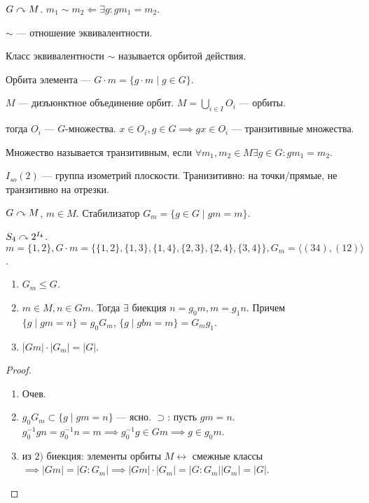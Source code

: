 \begin{definition}
    $G \curvearrowright M$.  $m_1 \sim m_2 \Leftarrow \exists g\!: gm_1 = m_2$.
\end{definition}
\begin{statement}
    $\sim$ --- отношение эквивалентности.
\end{statement}
\begin{definition}
    Класс эквивалентности $\sim$ называется орбитой действия.
\end{definition}
\begin{definition}
    Орбита элемента --- $G \cdot m = \{g \cdot m \mid g \in G\}$.
\end{definition}
 \begin{remark}
    $M$ --- дизъюнктное объединение орбит.
    $M = \bigcup\limits_{i \in I} O_i$ --- орбиты. 

    тогда $O_i$ ---  $G$-множества.  $x \in O_i, g \in G \implies gx \in O_i$ --- транзитивные множества.
\end{remark}
\begin{definition}
    Множество называется транзитивным, если $\forall m_1, m_2 \in M \exists g \in G\!: gm_1 = m_2$.
\end{definition}
\begin{definition}
    $I_{so}(2)$ --- группа изометрий плоскости. Транизитивно: на точки/прямые, не транзитивно на отрезки.
\end{definition}
\begin{definition}
    $G \curvearrowright M$,  $m \in M$. Стабилизатор  $G_m = \{g \in G \mid gm = m\}$.
\end{definition}
\begin{example}
    $S_4 \curvearrowright 2^{I_4}$.  $m = \{1,2\}, G \cdot m = \{ \{1,2\}, \{1,3\}, \{1,4\}, \{2,3\},\{2,4\},\{3,4\}\}, G_m = \langle (34), (12) \rangle$.
\end{example}
\begin{theorem}
    \begin{enumerate}
        \item $G_m \le G$.
        \item $m \in M, n \in Gm$.  Тогда $\exists$ биекция  $n = g_0m, m=g_1n$. Причем $\{g \mid gm = n\} = g_0 G_m$, $\{g \mid gbn = m \} = G_mg_1$.
        \item $|Gm| \cdot |G_m| = |G|$.
    \end{enumerate}
\end{theorem}
\begin{proof}
    \begin{enumerate}
        \item Очев.
        \item $g_0G_m \subset \{g \mid gm = n\}$ --- ясно. $\supset$: пусть  $gm = n$.  $g_0^{-1}gn = g_0^{-1}n = m \implies g_0^{-1}g \in Gm \implies g \in g_0m$.
        \item из $2)$ биекция: элементы орбиты $M \leftrightarrow $ смежные классы  $\implies |Gm| = |G : G_m| \implies |Gm|\cdot |G_m| = |G:G_m||G_m| = |G|$.
    \end{enumerate}
\end{proof}
